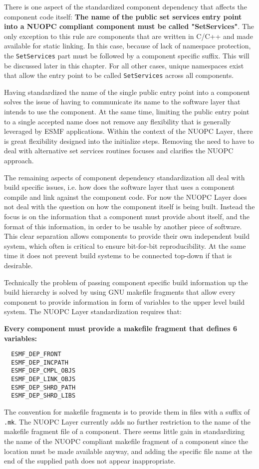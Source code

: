 There is one aspect of the standardized component dependency that affects the component code itself: {\bf The name of the public set services entry point into a NUOPC compliant component must be called "SetServices"}. The only exception to this rule are components that are written in C/C++ and made available for static linking. In this case, because of lack of namespace protection, the {\tt SetServices} part must be followed by a component specific suffix. This will be discussed later in this chapter. For all other cases, unique namespaces exist that allow the entry point to be called {\tt SetServices} across all components.

Having standardized the name of the single public entry point into a component solves the issue of having to communicate its name to the software layer that intends to use the component. At the same time, limiting the public entry point to a single accepted name does not remove any flexibility that is generally leveraged by ESMF applications. Within the context of the NUOPC Layer, there is great flexibility designed into the initialize steps. Removing the need to have to deal with alternative set services routines focuses and clarifies the NUOPC approach.

The remaining aspects of component dependency standardization all deal with build specific issues, i.e. how does the software layer that uses a component compile and link against the component code. For now the NUOPC Layer does not deal with the question on how the component itself is being built. Instead the focus is on the information that a component must provide about itself, and the format of this information, in order to be usable by another piece of software. This clear separation allows components to provide their own independent build system, which often is critical to ensure bit-for-bit reproducibility. At the same time it does not prevent build systems to be connected top-down if that is desirable.

Technically the problem of passing component specific build information up the build hierarchy is solved by using GNU makefile fragments that allow every component to provide information in form of variables to the upper level build system. The NUOPC Layer standardization requires that: {\bf Every component must provide a makefile fragment that defines 6 variables:
\begin{verbatim}
  ESMF_DEP_FRONT     
  ESMF_DEP_INCPATH   
  ESMF_DEP_CMPL_OBJS 
  ESMF_DEP_LINK_OBJS 
  ESMF_DEP_SHRD_PATH 
  ESMF_DEP_SHRD_LIBS 
\end{verbatim}
}
The convention for makefile fragments is to provide them in files with a suffix of {\tt .mk}.  The NUOPC Layer currently adds no further restriction to the name of the makefile fragment file of a component. There seems little gain in standardizing the name of the NUOPC compliant makefile fragment of a component since the location must be made available anyway, and adding the specific file name at the end of the supplied path does not appear inappropriate.

